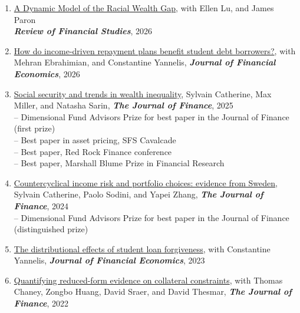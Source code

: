 \documentclass[6pt,letterpaper]{article}
\begin{document}
\begin{enumerate}	
	\item \href{https://sylcath.github.io/sylvaincatherine.net/files/CLP.pdf}{A Dynamic Model of the Racial Wealth Gap}, with Ellen Lu, and James Paron \\
	{\textit{\textbf{Review of Financial Studies}}}, 2026  \vspace{.1cm} 
	\item \href{https://sylcath.github.io/sylvaincatherine.net/files/CEY.pdf}{How do income-driven repayment plans benefit student debt borrowers?}, with Mehran Ebrahimian, and Constantine Yannelis, \textit{\textbf{Journal of Financial Economics}}, 2026  \vspace{.1cm} 
	\item \href{https://sylcath.github.io/sylvaincatherine.net/files/CMS_JF.pdf}{Social security and trends in wealth inequality}, Sylvain Catherine, Max Miller, and Natasha Sarin, \textit{\textbf{The Journal of Finance}},
	2025  \vspace{.1cm} \\
	{\small -- Dimensional Fund Advisors Prize for best paper in the Journal of Finance (first prize) } \\
	{\small -- Best paper in asset pricing, SFS Cavalcade } \\
	{\small -- Best paper, Red Rock Finance conference } \\
	{\small -- Best paper, Marshall Blume Prize in Financial Research } 
	\item \href{https://sylcath.github.io/sylvaincatherine.net/files/CountercyclicalRiskSweden.pdf}{Countercyclical income risk and portfolio choices: evidence from Sweden}, Sylvain Catherine, Paolo Sodini, and Yapei Zhang,  \textit{\textbf{The Journal of Finance}}, 2024  \vspace{.1cm} \\
	{\small -- Dimensional Fund Advisors Prize for best paper in the Journal of Finance (distinguished prize) } \\
	\item \href{https://sylcath.github.io/sylvaincatherine.net/files/Student%20Loan%20Forgiveness.pdf}{The distributional effects of student loan forgiveness}, with Constantine Yannelis,
	\textit{\textbf{Journal of Financial Economics}}, 2023 
	\vspace{.1cm}
	\item \href{https://sylcath.github.io/sylvaincatherine.net/files/CollateralConstraints.pdf}{Quantifying reduced-form evidence on collateral constraints}, with Thomas Chaney, Zongbo Huang, David Sraer, and David Thesmar, \textit{\textbf{The Journal of Finance}}, 2022

\end{enumerate}
\end{document}

